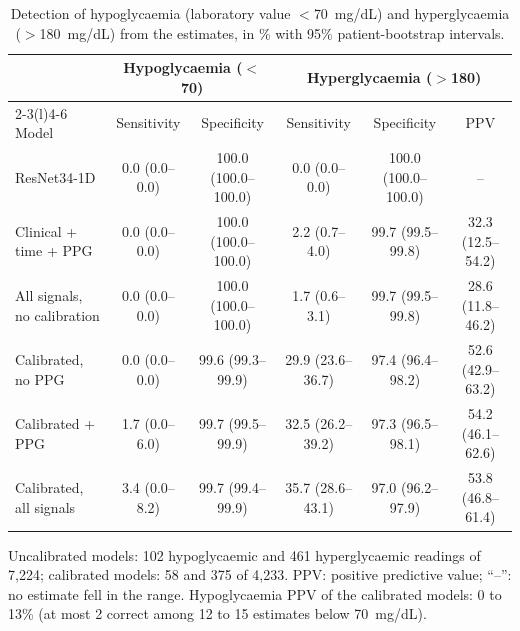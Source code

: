 \documentclass[11pt]{article}
\newcommand{\mgdl}{mg/dL}
\begin{document}
\begin{table}[!htbp]
\centering\footnotesize\setlength{\tabcolsep}{3pt}
\begin{threeparttable}
\caption{Detection of hypoglycaemia (laboratory value $<$70~\mgdl{}) and hyperglycaemia ($>$180~\mgdl{}) from the estimates, in \% with 95\% patient-bootstrap intervals.}
\label{tab:detect}
\begin{tabular}{@{}lccccc@{}}
\toprule
& \multicolumn{2}{c}{Hypoglycaemia ($<$70)} & \multicolumn{3}{c}{Hyperglycaemia ($>$180)} \\
\cmidrule(lr){2-3}\cmidrule(l){4-6}
Model & Sensitivity & Specificity & Sensitivity & Specificity & PPV \\
\midrule
ResNet34-1D & 0.0 (0.0--0.0) & 100.0 (100.0--100.0) & 0.0 (0.0--0.0) & 100.0 (100.0--100.0) & -- \\
Clinical + time + PPG & 0.0 (0.0--0.0) & 100.0 (100.0--100.0) & 2.2 (0.7--4.0) & 99.7 (99.5--99.8) & 32.3 (12.5--54.2) \\
All signals, no calibration & 0.0 (0.0--0.0) & 100.0 (100.0--100.0) & 1.7 (0.6--3.1) & 99.7 (99.5--99.8) & 28.6 (11.8--46.2) \\
Calibrated, no PPG & 0.0 (0.0--0.0) & 99.6 (99.3--99.9) & 29.9 (23.6--36.7) & 97.4 (96.4--98.2) & 52.6 (42.9--63.2) \\
Calibrated + PPG & 1.7 (0.0--6.0) & 99.7 (99.5--99.9) & 32.5 (26.2--39.2) & 97.3 (96.5--98.1) & 54.2 (46.1--62.6) \\
Calibrated, all signals & 3.4 (0.0--8.2) & 99.7 (99.4--99.9) & 35.7 (28.6--43.1) & 97.0 (96.2--97.9) & 53.8 (46.8--61.4) \\
\bottomrule
\end{tabular}
\begin{tablenotes}\footnotesize
\item Uncalibrated models: 102 hypoglycaemic and 461 hyperglycaemic readings of 7,224; calibrated models: 58 and 375 of 4,233. PPV: positive predictive value; ``--'': no estimate fell in the range. Hypoglycaemia PPV of the calibrated models: 0 to 13\% (at most 2 correct among 12 to 15 estimates below 70~\mgdl{}).
\end{tablenotes}
\end{threeparttable}
\end{table}
\end{document}
